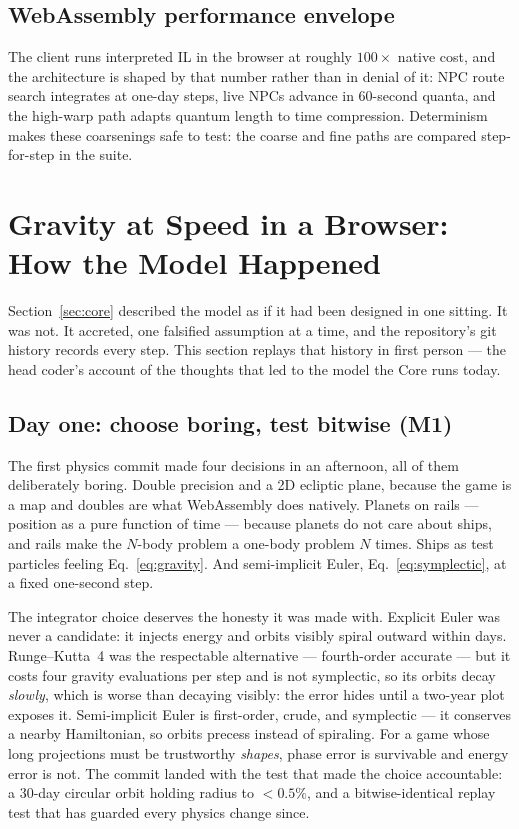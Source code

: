 \documentclass[10pt,twocolumn]{article}
\begin{document}
\subsection{WebAssembly performance envelope}

The client runs interpreted IL in the browser at roughly $100\times$ native cost, and
the architecture is shaped by that number rather than in denial of it: NPC route search
integrates at one-day steps, live NPCs advance in 60-second quanta, and the high-warp
path adapts quantum length to time compression. Determinism makes these coarsenings safe
to test: the coarse and fine paths are compared step-for-step in the suite.

\section{Gravity at Speed in a Browser: How the Model Happened}
\label{sec:history}

Section~\ref{sec:core} described the model as if it had been designed in one sitting. It
was not. It accreted, one falsified assumption at a time, and the repository's git history
records every step. This section replays that history in first person --- the head coder's
account of the thoughts that led to the model the Core runs today.

\subsection{Day one: choose boring, test bitwise (M1)}

The first physics commit made four decisions in an afternoon, all of them deliberately
boring. Double precision and a 2D ecliptic plane, because the game is a map and doubles
are what WebAssembly does natively. Planets on rails --- position as a pure function of
time --- because planets do not care about ships, and rails make the $N$-body problem a
one-body problem $N$ times. Ships as test particles feeling Eq.~\eqref{eq:gravity}. And
semi-implicit Euler, Eq.~\eqref{eq:symplectic}, at a fixed one-second step.

The integrator choice deserves the honesty it was made with. Explicit Euler was never a
candidate: it injects energy and orbits visibly spiral outward within days. Runge--Kutta~4
was the respectable alternative --- fourth-order accurate --- but it costs four gravity
evaluations per step and is not symplectic, so its orbits decay \emph{slowly}, which is
worse than decaying visibly: the error hides until a two-year plot exposes it.
Semi-implicit Euler is first-order, crude, and symplectic --- it conserves a nearby
Hamiltonian, so orbits precess instead of spiraling. For a game whose long projections
must be trustworthy \emph{shapes}, phase error is survivable and energy error is not.
The commit landed with the test that made the choice accountable: a 30-day circular orbit
holding radius to $<0.5\%$, and a bitwise-identical replay test that has guarded every
physics change since.
\end{document}
